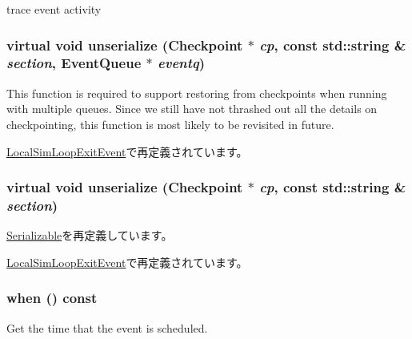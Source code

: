trace event activity \hypertarget{classEvent_a906bb365c627ae3a9ae49fc646d267cf}{
\subsubsection[{unserialize}]{\setlength{\rightskip}{0pt plus 5cm}virtual void unserialize ({\bf Checkpoint} $\ast$ {\em cp}, \/  const std::string \& {\em section}, \/  {\bf EventQueue} $\ast$ {\em eventq})}}
\label{classEvent_a906bb365c627ae3a9ae49fc646d267cf}
This function is required to support restoring from checkpoints when running with multiple queues. Since we still have not thrashed out all the details on checkpointing, this function is most likely to be revisited in future. 

\hyperlink{classLocalSimLoopExitEvent_a906bb365c627ae3a9ae49fc646d267cf}{LocalSimLoopExitEvent}で再定義されています。\hypertarget{classEvent_af100c4e9feabf3cd918619c88c718387}{
\subsubsection[{unserialize}]{\setlength{\rightskip}{0pt plus 5cm}virtual void unserialize ({\bf Checkpoint} $\ast$ {\em cp}, \/  const std::string \& {\em section})}}
\label{classEvent_af100c4e9feabf3cd918619c88c718387}


\hyperlink{classSerializable_af100c4e9feabf3cd918619c88c718387}{Serializable}を再定義しています。

\hyperlink{classLocalSimLoopExitEvent_af100c4e9feabf3cd918619c88c718387}{LocalSimLoopExitEvent}で再定義されています。\hypertarget{classEvent_a1883243a0117678c5695f2435dcabbdc}{
\subsubsection[{when}]{ when () const}}
\label{classEvent_a1883243a0117678c5695f2435dcabbdc}


Get the time that the event is scheduled. 


